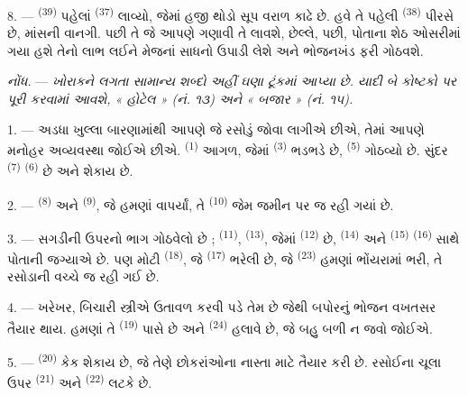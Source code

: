 8. ---  \textsuperscript{(39)} પહેલાં  \textsuperscript{(37)} લાવ્યો, જેમાં હજી થોડો સૂપ વરાળ કાઢે છે.
હવે તે પહેલી  \textsuperscript{(38)} પીરસે છે, માંસની
વાનગી. પછી તે જે આપણે ગણાવી તે લાવશે, છેલ્લે, 
પછી, પોતાના શેઠ ઓસરીમાં ગયા હશે તેનો લાભ લઈને મેજનાં સાધનો ઉપાડી લેશે
અને ભોજનખંડ ફરી ગોઠવશે.

\textit{નોંધ.} --- \textit{ખોરાકને લગતા સામાન્ય શબ્દો અહીં ઘણા
ટૂંકમાં આપ્યા છે. યાદી બે કોષ્ટકો પર પૂરી કરવામાં આવશે, « હોટેલ »
(નં. ૧૩) અને « બજાર » (નં. ૧૫).}

\VUsaut{4.6mm}
\VUsaut{3.0mm}

1. --- અડધા ખુલ્લા બારણામાંથી આપણે જે રસોડું જોવા લાગીએ છીએ, તેમાં
આપણે મનોહર અવ્યવસ્થા જોઈએ છીએ.  \textsuperscript{(1)}
આગળ, જેમાં  \textsuperscript{(3)} ભડભડે છે,  \textsuperscript{(5)} ગોઠવ્યો છે. સુંદર 
\textsuperscript{(7)}  \textsuperscript{(6)} છે
અને શેકાય છે.

2. ---  \textsuperscript{(8)} અને  \textsuperscript{(9)}, જે હમણાં વાપર્યાં, તે  \textsuperscript{(10)} જેમ જમીન પર જ રહી ગયાં છે.

3. --- સગડીની ઉપરનો ભાગ ગોઠવેલો છે ; 
\textsuperscript{(11)},  \textsuperscript{(13)},
જેમાં  \textsuperscript{(12)} છે, 
\textsuperscript{(14)} અને 
\textsuperscript{(15)}  \textsuperscript{(16)} સાથે
પોતાની જગ્યાએ છે. પણ મોટી 
\textsuperscript{(18)}, જે 
\textsuperscript{(17)} ભરેલી છે, જે 
\textsuperscript{(23)} હમણાં ભોંયરામાં ભરી, તે રસોડાની વચ્ચે જ રહી ગઈ
છે.

4. --- ખરેખર, બિચારી સ્ત્રીએ ઉતાવળ કરવી પડે તેમ છે જેથી બપોરનું ભોજન
વખતસર તૈયાર થાય. હમણાં તે  \textsuperscript{(19)}
પાસે છે અને  \textsuperscript{(24)} હલાવે છે, જે બહુ બળી ન
જવો જોઈએ.

5. ---  \textsuperscript{(20)} કેક શેકાય છે, જે તેણે
છોકરાંઓના નાસ્તા માટે તૈયાર કરી છે. રસોઈના ચૂલા ઉપર 
\textsuperscript{(21)} અને  \textsuperscript{(22)} લટકે છે.

\VUsaut{4.0mm}
\VUsaut{3.0mm}

